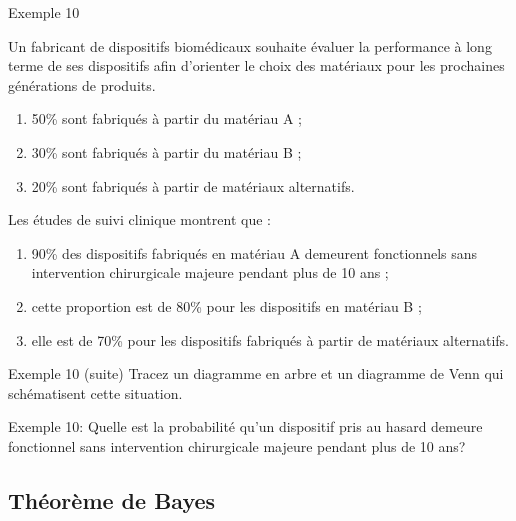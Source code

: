 \documentclass{BeamerTemplate}
\begin{document}
\begin{frame}[t]{Exemple 10}

{\footnotesize Un fabricant de dispositifs biomédicaux souhaite évaluer la performance à long terme de ses dispositifs afin d'orienter le choix des matériaux pour les prochaines générations de produits.
\begin{enumerate}[$\bullet$]
\item 50\% sont fabriqués à partir du matériau A ;
\item 30\% sont fabriqués à partir du matériau B ;
\item 20\% sont fabriqués à partir de matériaux alternatifs.
\end{enumerate}

Les études de suivi clinique montrent que :
\begin{enumerate}[$\bullet$]
\item 90\% des dispositifs fabriqués en matériau A demeurent fonctionnels sans intervention chirurgicale majeure pendant plus de 10 ans ;
\item cette proportion est de 80\% pour les dispositifs en matériau B ;
\item elle est de 70\% pour les dispositifs fabriqués à partir de matériaux alternatifs.
\end{enumerate}





    
}
\end{frame}

\begin{frame}[t]{Exemple 10 (suite)}
Tracez un diagramme en arbre et un diagramme de Venn qui schématisent cette situation.
 \vspace{7cm}
\end{frame}

\begin{frame}[plain,t]%


\QuizBanner
Exemple 10: Quelle est la probabilité qu'un dispositif pris au hasard demeure fonctionnel sans intervention chirurgicale majeure pendant plus de 10 ans?

 \vspace{5.6cm}

\end{frame}

\subsection{Théorème de Bayes}
\end{document}
